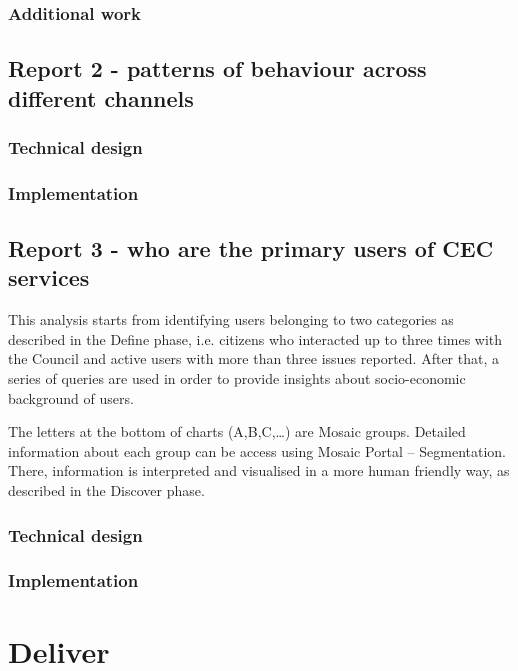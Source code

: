 			\subsubsection{Additional work}
			
		\subsection{Report 2 - patterns of behaviour across different channels}
		
			\subsubsection{Technical design}
			
			\subsubsection{Implementation}
			
		\subsection{Report 3 - who are the primary users of CEC services}
		
This analysis starts from identifying users belonging to two categories as described in the Define phase, i.e. citizens who interacted up to three times with the Council and active users with more than three issues reported. After that, a series of queries are used in order to provide insights about socio-economic background of users.

The letters at the bottom of charts (A,B,C,…) are Mosaic groups. Detailed information about each group can be access using Mosaic Portal – Segmentation. There, information is interpreted and visualised in a more human friendly way, as described in the Discover phase.

			\subsubsection{Technical design}
			
			\subsubsection{Implementation}
	
	\section{Deliver}
	
